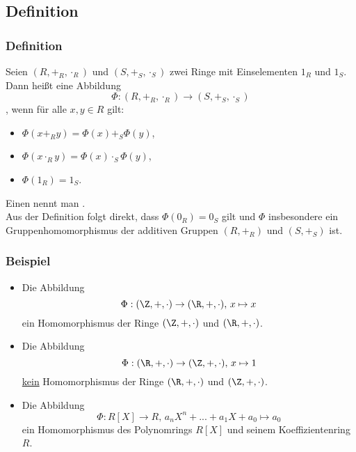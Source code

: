 \subsection{Definition}
%
\begin{frame}\frametitle{Definition}
	
	Seien $(R,+_R,\cdot_R)$ und $(S, +_S, \cdot_S)$ zwei Ringe mit Einselementen $1_R$ und $1_S$.
	Dann hei{\ss}t eine Abbildung
	$$
		\Phi: (R,+_R,\cdot_R) \to (S, +_S, \cdot_S)
	$$
	, wenn f\"ur alle $x,y \in R$ gilt:
	\begin{itemize}
		\item $\Phi(x +_R y) = \Phi(x) +_S \Phi(y)$,
		\item $\Phi(x \cdot_R y) = \Phi(x) \cdot_S \Phi(y)$, 
		\item $\Phi(1_R) = 1_S$.
	\end{itemize}
	
	\vfill
	Einen  nennt man .\\\pause
	\vfill
	Aus der Definition folgt direkt, dass $\Phi(0_R)=0_S$ gilt und $\Phi$ insbesondere ein Gruppenhomomorphismus der additiven Gruppen $(R,+_R)$ und $(S,+_S)$ ist.
	
\end{frame}
%
%
\begin{frame}\frametitle{Beispiel}
	\begin{itemize}
	\item Die Abbildung
	$$
		\Phi: (\Z,+,\cdot) \to (\R,+,\cdot), \, x \mapsto x
	$$
	ein Homomorphismus der Ringe $(\Z,+,\cdot)$ und $(\R,+,\cdot)$. \pause
	\item Die Abbildung
	$$
		\Phi: (\R,+,\cdot) \to (\Z,+,\cdot), \, x \mapsto 1
	$$
	\underline{kein} Homomorphismus der Ringe $(\R,+,\cdot)$ und $(\Z,+,\cdot)$. \pause
	\item Die Abbildung
	$$
		\Phi: R[X] \to R, \, a_nX^n + ... + a_1X+a_0 \mapsto a_0 
	$$
	ein Homomorphismus des Polynomrings $R[X]$ und seinem Koeffizientenring $R$.
	\end{itemize}
	
\end{frame}
%
